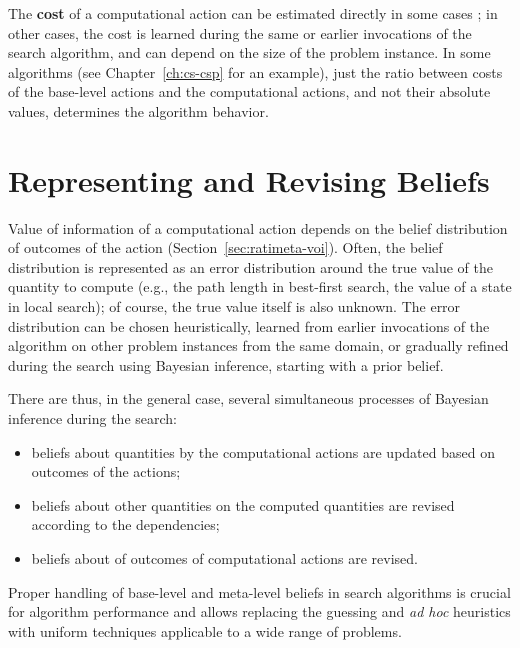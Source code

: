 The {\bf cost} of a computational action can be estimated directly in
some cases \cite{Russell.right}; in other cases, the cost is learned
during the same or earlier invocations of the search algorithm, and
can depend on the size of the problem instance. In some algorithms
(see Chapter~\ref{ch:cs-csp} for an example), just the ratio between
costs of the base-level actions and the computational actions, and not
their absolute values, determines the algorithm behavior.

\section{Representing and Revising Beliefs}

Value of information of a computational action depends on the belief
distribution of outcomes of the action
(Section~\ref{sec:ratimeta-voi}).  Often, the belief distribution is
represented as an error distribution around the true value of the
quantity to compute (e.g., the path length in best-first search, the
value of a state in local search); of course, the true value itself is
also unknown.  The error distribution can be chosen heuristically,
learned from earlier invocations of the algorithm on other problem
instances from the same domain, or gradually refined during the search
using Bayesian inference, starting with a prior belief. 

There are thus, in the general case, several simultaneous processes of
Bayesian inference during the search:
\begin{itemize}
\item beliefs about quantities  by the computational actions
are updated based on outcomes of the actions;
\item beliefs about other quantities  on the computed
quantities are revised according to the dependencies;
\item beliefs about  of  outcomes of computational
actions are revised.
\end{itemize}
Proper handling of base-level and meta-level beliefs in search
algorithms is crucial for algorithm performance and allows replacing
the guessing and {\it ad hoc} heuristics with uniform techniques
applicable to a wide range of problems. 

